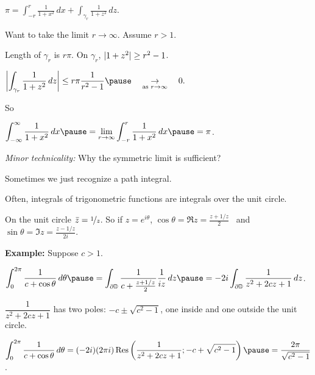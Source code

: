 \documentclass[10pt,aspectratio=169]{beamer}
\begin{document}
\begin{frame}
\qquad $\displaystyle \pi 
=
\int_{-r}^r \frac{1}{1+x^2} \, dx
+
\int_{\gamma_r} \frac{1}{1+z^2} \, dz$.

\pause
\medskip

Want to take the limit $r \to \infty$. \pause Assume $r > 1$.

\medskip
\pause

Length of $\gamma_r$ is $r\pi$.  \quad \pause On $\gamma_r$, $\lvert {1+z^2} \rvert \geq r^2-1$.

\medskip
\pause

\qquad $\displaystyle
\abs{
\int_{\gamma_r} \frac{1}{1+z^2} \, dz 
}
\leq
r \pi \frac{1}{r^2-1}
\pause
\quad\underset{\text{as } r \to \infty}{\to}\quad 0 .
$

\medskip
\pause

So

\medskip
\qquad
$\displaystyle
\int_{-\infty}^\infty
\frac{1}{1+x^2} \, dx
\pause
=
\lim_{r\to \infty} \int_{-r}^r 
\frac{1}{1+x^2} \, dx
\pause
= \pi$.

\bigskip
\pause

\emph{Minor technicality:} Why the symmetric limit is
sufficient?

\end{frame}

\begin{frame}

Sometimes we just recognize a path integral.

\medskip
\pause

Often, integrals of trigonometric functions are integrals over the unit
circle.

On the unit circle
$\bar{z} = \nicefrac{1}{z}$. \quad  So if $z=e^{i\theta}$, \quad
$\cos \theta = \Re z = \frac{z+1/z}{2}$ ~and~
$\sin \theta = \Im z = \frac{z-1/z}{2i}$.

\pause
\medskip

\textbf{Example:}
Suppose $c > 1$.

\medskip

\qquad$\displaystyle
\int_0^{2\pi} \frac{1}{c+\cos \theta} \, d\theta 
\pause
=
\int_{\partial \D} \frac{1}{c+\frac{z+1/z}{2}} \frac{1}{iz} \, dz
\pause
=
-2i
\int_{\partial \D} \frac{1}{z^2 + 2cz + 1} \, dz$.

\pause
\medskip

$\dfrac{1}{z^2 + 2cz + 1}$ has two poles: $-c \pm \sqrt{c^2-1}$,
one inside and one outside the unit circle.

\pause
\medskip

\qquad$\displaystyle
\int_0^{2\pi} \frac{1}{c+\cos \theta} \, d\theta 
=
(-2i)
(2 \pi i)
\operatorname{Res}
\left(\frac{1}{z^2 + 2cz + 1}; -c+\sqrt{c^2-1}\right)
\pause
=
\frac{2\pi}{\sqrt{c^2-1}}$.

\end{frame}
\end{document}
